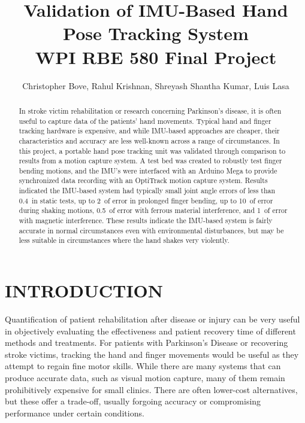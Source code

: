 \documentclass[letterpaper, 10 pt, conference]{ieeeconf}  %
\title{\LARGE \bf
Validation of IMU-Based Hand Pose Tracking System \\ WPI RBE 580 Final Project
}
\author{Christopher Bove, Rahul Krishnan, Shreyash Shantha Kumar, Luis Lasa}
\begin{document}
\maketitle
\thispagestyle{empty}
\pagestyle{empty}


\begin{abstract}
In stroke victim rehabilitation or research concerning Parkinson's disease, it is often useful to capture data of the patients' hand movements. Typical hand and finger tracking hardware is expensive, and while IMU-based approaches are cheaper, their characteristics and accuracy are less well-known across a range of circumstances. In this project, a portable hand pose tracking unit was validated through comparison to results from a motion capture system. A test bed was created to robustly test finger bending motions, and the IMU's were interfaced with an Arduino Mega to provide synchronized data recording with an OptiTrack motion capture system. Results indicated the IMU-based system had typically small joint angle errors of less than 0.4\degree\ in static tests, up to 2\degree\ of error in prolonged finger bending, up to 10\degree\ of error during shaking motions, 0.5\degree\ of error with ferrous material interference, and 1\degree\ of error with magnetic interference. These results indicate the IMU-based system is fairly accurate in normal circumstances even with environmental disturbances, but may be less suitable in circumstances where the hand shakes very violently.
\end{abstract}

\section{INTRODUCTION}
Quantification of patient rehabilitation after disease or injury can be very useful in objectively evaluating the effectiveness and patient recovery time of different methods and treatments. For patients with Parkinson's Disease or recovering stroke victims, tracking the hand and finger movements would be useful as they attempt to regain fine motor skills. While there are many systems that can produce accurate data, such as visual motion capture, many of them remain prohibitively expensive for small clinics. There are often lower-cost alternatives, but these offer a trade-off, usually forgoing accuracy or compromising performance under certain conditions. 
\end{document}
